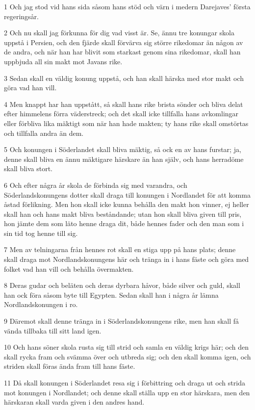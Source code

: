 \par 1 Och jag stod vid hans sida såsom hans stöd och värn i medern Darejaves' första regeringsår.
\par 2 Och nu skall jag förkunna för dig vad visst är. Se, ännu tre konungar skola uppstå i Persien, och den fjärde skall förvärva sig större rikedomar än någon av de andra, och när han har blivit som starkast genom sina rikedomar, skall han uppbjuda all sin makt mot Javans rike.
\par 3 Sedan skall en väldig konung uppstå, och han skall härska med stor makt och göra vad han vill.
\par 4 Men knappt har han uppstått, så skall hans rike brista sönder och bliva delat efter himmelens förra väderstreck; och det skall icke tillfalla hans avkomlingar eller förbliva lika mäktigt som när han hade makten; ty hans rike skall omstörtas och tillfalla andra än dem.
\par 5 Och konungen i Söderlandet skall bliva mäktig, så ock en av hans furstar; ja, denne skall bliva en ännu mäktigare härskare än han själv, och hans herradöme skall bliva stort.
\par 6 Och efter några år skola de förbinda sig med varandra, och Söderlandskonungens dotter skall draga till konungen i Nordlandet för att komma åstad förlikning. Men hon skall icke kunna behålla den makt hon vinner, ej heller skall han och hans makt bliva beståndande; utan hon skall bliva given till pris, hon jämte dem som läto henne draga dit, både hennes fader och den man som i sin tid tog henne till sig.
\par 7 Men av telningarna från hennes rot skall en stiga upp på hans plats; denne skall draga mot Nordlandskonungens här och tränga in i hans fäste och göra med folket vad han vill och behålla övermakten.
\par 8 Deras gudar och beläten och deras dyrbara håvor, både silver och guld, skall han ock föra såsom byte till Egypten. Sedan skall han i några år lämna Nordlandskonungen i ro.
\par 9 Däremot skall denne tränga in i Söderlandskonungens rike, men han skall få vända tillbaka till sitt land igen.
\par 10 Och hans söner skola rusta sig till strid och samla en väldig krigs här; och den skall rycka fram och svämma över och utbreda sig; och den skall komma igen, och striden skall föras ända fram till hans fäste.
\par 11 Då skall konungen i Söderlandet resa sig i förbittring och draga ut och strida mot konungen i Nordlandet; och denne skall ställa upp en stor härskara, men den härskaran skall varda given i den andres hand.
